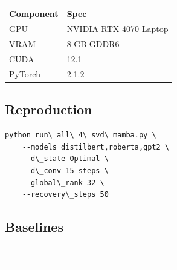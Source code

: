 \begin{table}[H]
\centering
\small
\begin{tabular}{ll}
\toprule
\textbf{Component} & \textbf{Spec} \\
\midrule
GPU & NVIDIA RTX 4070 Laptop \\
VRAM & 8 GB GDDR6 \\
CUDA & 12.1 \\
PyTorch & 2.1.2 \\
\bottomrule
\end{tabular}
\end{table}

\subsection{Reproduction}

\begin{lstlisting}
python run\_all\_4\_svd\_mamba.py \
    --models distilbert,roberta,gpt2 \
    --d\_state Optimal \
    --d\_conv 15 steps \
    --global\_rank 32 \
    --recovery\_steps 50
\end{lstlisting}

\subsection{Baselines}

\begin{lstlisting}

---
\end{lstlisting}